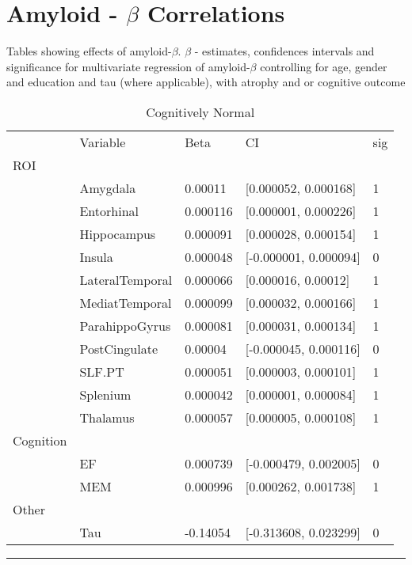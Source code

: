 \documentclass{article}
\begin{document}


\section*{Amyloid - $\beta$ Correlations}
Tables showing effects of amyloid-$\beta$. $\beta$ - estimates, confidences intervals and significance for multivariate regression of amyloid-$\beta$ controlling for age, gender and education and tau (where applicable), with atrophy and or cognitive outcome

\begin{table}[H]
\centering
\caption{Cognitively Normal} 
\begin{tabular}{lllll}
   & Variable & Beta & CI & sig \\ 
 ROI &   &   &   &  \\ 
   \rowcolor{green!10}  & Amygdala & 0.00011 & [0.000052, 0.000168] & 1 \\ 
   \rowcolor{green!10}  & Entorhinal & 0.000116 & [0.000001, 0.000226] & 1 \\ 
   \rowcolor{green!10}  & Hippocampus & 0.000091 & [0.000028, 0.000154] & 1 \\ 
    & Insula & 0.000048 & [-0.000001, 0.000094] & 0 \\ 
   \rowcolor{green!10}  & LateralTemporal & 0.000066 & [0.000016, 0.00012] & 1 \\ 
   \rowcolor{green!10}  & MediatTemporal & 0.000099 & [0.000032, 0.000166] & 1 \\ 
   \rowcolor{green!10}  & ParahippoGyrus & 0.000081 & [0.000031, 0.000134] & 1 \\ 
    & PostCingulate & 0.00004 & [-0.000045, 0.000116] & 0 \\ 
   \rowcolor{green!10}  & SLF.PT & 0.000051 & [0.000003, 0.000101] & 1 \\ 
   \rowcolor{green!10}  & Splenium & 0.000042 & [0.000001, 0.000084] & 1 \\ 
   \rowcolor{green!10}  & Thalamus & 0.000057 & [0.000005, 0.000108] & 1 \\ 
   \midrule
Cognition &   &   &   &  \\ 
    & EF & 0.000739 & [-0.000479, 0.002005] & 0 \\ 
   \rowcolor{green!10}  & MEM & 0.000996 & [0.000262, 0.001738] & 1 \\ 
   \midrule
Other &   &   &   &  \\ 
    & Tau & -0.14054 & [-0.313608, 0.023299] & 0 \\ 
  \end{tabular}
\end{table}
\noindent\rule[0.5ex]{\linewidth}{1pt}
\end{document}
